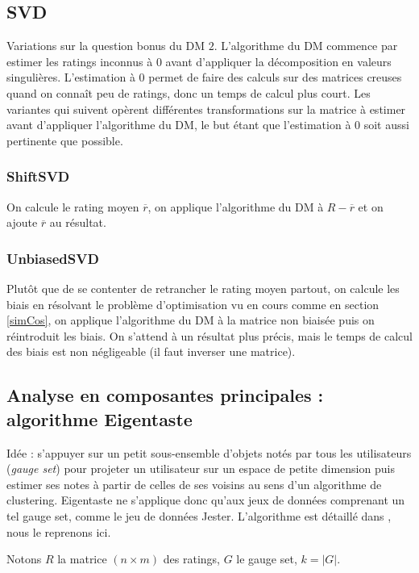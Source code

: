 \documentclass[11pt, openany, a4paper]{article}
\begin{document}
	\subsection{SVD}
	Variations sur la question bonus du DM $2$. L'algorithme du DM commence par estimer les ratings inconnus à $0$ avant d'appliquer la décomposition en valeurs singulières. L'estimation à 0 permet de faire des calculs sur des matrices creuses quand on connaît peu de ratings, donc un temps de calcul plus court. Les variantes qui suivent opèrent différentes transformations sur la matrice à estimer avant d'appliquer l'algorithme du DM, le but étant que l'estimation à 0 soit aussi pertinente que possible.

		\subsubsection{ShiftSVD} 
		
		On calcule le rating moyen $\overline{r}$, on applique l'algorithme du DM à $R-\overline{r}$ et on ajoute $\overline{r}$ au résultat.
			
		\subsubsection{UnbiasedSVD}
		
		Plutôt que de se contenter de retrancher le rating moyen partout, on calcule les biais en résolvant le problème d'optimisation vu en cours comme en section \ref{simCos}, on applique l'algorithme du DM à la matrice non biaisée puis on réintroduit les biais.
		On s'attend à un résultat plus précis, mais le temps de calcul des biais est non négligeable (il faut inverser une matrice).
		
	\subsection{Analyse en composantes principales : algorithme Eigentaste}
		Idée : s'appuyer sur un petit sous-ensemble d'objets notés par tous les utilisateurs (\emph{gauge set}) pour projeter un utilisateur sur un espace de petite dimension puis estimer ses notes à partir de celles de ses voisins au sens d'un algorithme de clustering. Eigentaste ne s'applique donc qu'aux jeux de données comprenant un tel gauge set, comme le jeu de données Jester. L'algorithme est détaillé dans \cite{Goldberg2001}, nous le reprenons ici.
		
		Notons $R$ la matrice $(n\times m)$ des ratings, $G$ le gauge set, $k=|G|$.
		
\end{document}
